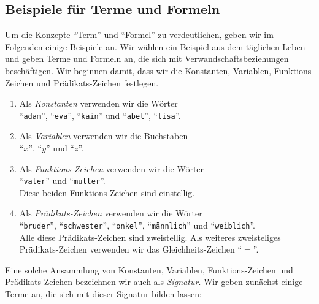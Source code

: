 \subsection{Beispiele f\"{u}r Terme und Formeln}
Um die Konzepte ``Term'' und ``Formel'' zu verdeutlichen, geben wir im Folgenden einige
Beispiele an.  Wir w\"{a}hlen ein Beispiel aus dem t\"{a}glichen Leben und geben Terme und Formeln an, die sich mit
Verwandschaftsbeziehungen besch\"{a}ftigen.  Wir beginnen damit, dass wir die Konstanten,
Variablen, Funktions-Zeichen und Pr\"{a}dikats-Zeichen festlegen.
\begin{enumerate}
\item Als \emph{Konstanten} verwenden wir die W\"{o}rter \\[0.2cm]
      \hspace*{1.3cm} ``\texttt{adam}'', ``\texttt{eva}'', ``\texttt{kain}'' und ``\texttt{abel}'',
      ``\texttt{lisa}''.
\item Als \emph{Variablen} verwenden wir die Buchstaben \\[0.2cm]
      \hspace*{1.3cm} ``$x$'', ``$y$'' und ``$z$''.
\item Als \emph{Funktions-Zeichen} verwenden wir die W\"{o}rter \\[0.2cm]
      \hspace*{1.3cm} ``\texttt{vater}'' und ``\texttt{mutter}''. \\[0.2cm]
      Diese beiden Funktions-Zeichen sind einstellig. 
\item Als \emph{Pr\"{a}dikats-Zeichen} verwenden wir die W\"{o}rter \\[0.2cm]
      \hspace*{1.3cm} ``\texttt{bruder}'', ``\texttt{schwester}'', ``\texttt{onkel}'',
      ``\texttt{m\"{a}nnlich}'' und ``\texttt{weiblich}''. \\[0.2cm]
      Alle diese Pr\"{a}dikats-Zeichen sind zweistellig.  Als weiteres zweisteliges
      Pr\"{a}dikats-Zeichen verwenden wir das Gleichheits-Zeichen ``$=$''.
\end{enumerate}
Eine solche Ansammlung von Konstanten,
Variablen, Funktions-Zeichen und Pr\"{a}dikats-Zeichen bezeichnen wir auch als
\emph{Signatur}.  Wir geben zun\"{a}chst einige Terme an, die sich mit dieser Signatur
bilden lassen:

